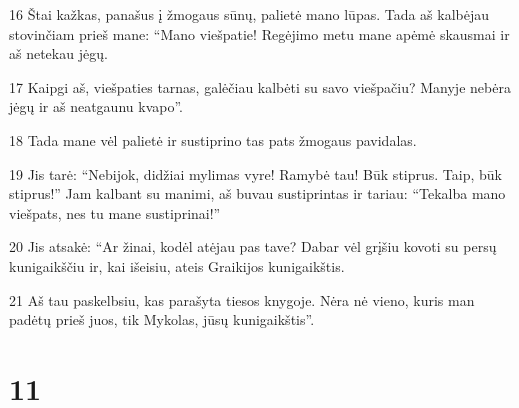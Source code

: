 \par 16 Štai kažkas, panašus į žmogaus sūnų, palietė mano lūpas. Tada aš kalbėjau stovinčiam prieš mane: “Mano viešpatie! Regėjimo metu mane apėmė skausmai ir aš netekau jėgų. 
\par 17 Kaipgi aš, viešpaties tarnas, galėčiau kalbėti su savo viešpačiu? Manyje nebėra jėgų ir aš neatgaunu kvapo”. 
\par 18 Tada mane vėl palietė ir sustiprino tas pats žmogaus pavidalas. 
\par 19 Jis tarė: “Nebijok, didžiai mylimas vyre! Ramybė tau! Būk stiprus. Taip, būk stiprus!” Jam kalbant su manimi, aš buvau sustiprintas ir tariau: “Tekalba mano viešpats, nes tu mane sustiprinai!” 
\par 20 Jis atsakė: “Ar žinai, kodėl atėjau pas tave? Dabar vėl grįšiu kovoti su persų kunigaikščiu ir, kai išeisiu, ateis Graikijos kunigaikštis. 
\par 21 Aš tau paskelbsiu, kas parašyta tiesos knygoje. Nėra nė vieno, kuris man padėtų prieš juos, tik Mykolas, jūsų kunigaikštis”.



\chapter{11}


